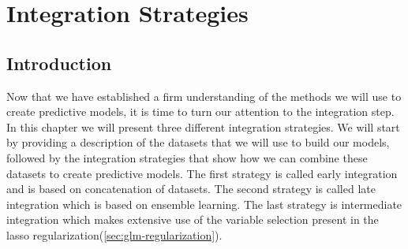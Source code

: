 \chapter{Integration Strategies}
\label{cha:integration}

\section{Introduction}
\label{sec:integration-introduction}
Now that we have established a firm understanding of the methods we will use to create predictive models, it is time to turn our attention to the integration step. In this chapter we will present three different integration strategies. We will start by providing a description of the datasets that we will use to build our models, followed by the integration strategies that show how we can combine these datasets to create predictive models. The first strategy is called early integration and is based on concatenation of datasets. The second strategy is called late integration which is based on ensemble learning. The last strategy is intermediate integration which makes extensive use of the variable selection present in the lasso regularization(\ref{sec:glm-regularization}).

